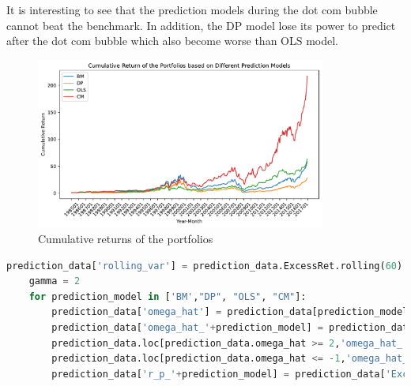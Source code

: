 \begin{enumerate}[(a)]
    It is interesting to see that the prediction models during the dot com bubble cannot beat the benchmark. In addition, the DP model lose its power to predict after the dot com bubble which also become worse than OLS model.

    \begin{figure}[htbp!]
        \centering
        \includegraphics[width=0.85\textwidth]{Out/Ex4_C.pdf}
        \caption{Cumulative returns of the portfolios}
    \end{figure}

    \begin{lstlisting}[language=Python, caption=Python code for portfolio weights, label={lst:q1a}, escapechar=|, frame=single, basicstyle=\small, showstringspaces=false, captionpos=b, breaklines=true, showspaces=false, showtabs=false, keywordstyle=\color{blue}, commentstyle=\color{gray}]
    prediction_data['rolling_var'] = prediction_data.ExcessRet.rolling(60).var()
    gamma = 2
    for prediction_model in ['BM',"DP", "OLS", "CM"]:
        prediction_data['omega_hat'] = prediction_data[prediction_model]/prediction_data['rolling_var']/gamma
        prediction_data['omega_hat_'+prediction_model] = prediction_data['omega_hat']
        prediction_data.loc[prediction_data.omega_hat >= 2,'omega_hat_'+prediction_model] = 2
        prediction_data.loc[prediction_data.omega_hat <= -1,'omega_hat_'+prediction_model] = -1
        prediction_data['r_p_'+prediction_model] = prediction_data['ExcessRet'] + prediction_data['omega_hat_'+prediction_model]*prediction_data['ExcessRet']
    \end{lstlisting}


\end{enumerate}
